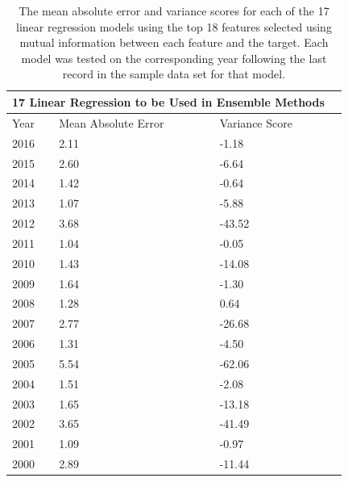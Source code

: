 \documentclass[12pt]{dalthesis}
\begin{document}
\begin{table}
	\caption{The mean absolute error and variance scores for each of the 17 linear regression models using the top 18 features selected using mutual information between each feature and the target. Each model was tested on the corresponding year following the last record in the sample data set for that model.}
	\label{tab:17years}
    \begin{tabular}{ |p{4cm}||p{4cm}|p{4cm}|p{4cm}|  }
       \hline
       \multicolumn{3}{|c|}{17 Linear Regression to be Used in Ensemble Methods } \\
       \hline
       Year    & Mean Absolute Error    & Variance Score \\
       \hline
       2016    & 2.11    & -1.18\\
       2015    & 2.60    & -6.64\\
       2014    & 1.42    & -0.64\\
       2013    & 1.07    & -5.88\\
       2012    & 3.68    & -43.52\\
       2011    & 1.04    & -0.05\\
       2010    & 1.43    & -14.08\\
       2009    & 1.64    & -1.30\\
       2008    & 1.28    & 0.64\\
       2007    & 2.77    & -26.68\\
       2006    & 1.31    & -4.50\\
       2005    & 5.54    & -62.06\\
       2004    & 1.51    & -2.08\\
       2003    & 1.65    & -13.18\\
       2002    & 3.65    & -41.49\\
       2001    & 1.09    & -0.97\\
       2000    & 2.89    & -11.44\\
       \hline
    \end{tabular}
\end{table} 
\end{document}
